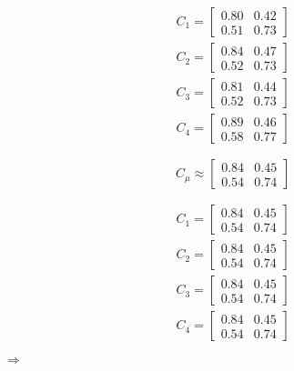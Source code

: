 \documentclass{article}
\begin{document}
\begin{align}
C_1=
\begin{bmatrix}
0.80 & 0.42 \\
0.51 & 0.73
\end{bmatrix}
\\
C_2=
\begin{bmatrix}
0.84 & 0.47 \\
0.52 & 0.73
\end{bmatrix}
\\
C_3=
\begin{bmatrix}
0.81 & 0.44 \\
0.52 & 0.73
\end{bmatrix}
\\
C_4=
\begin{bmatrix}
0.89 & 0.46 \\
0.58 & 0.77
\end{bmatrix}
\end{align}

\[
  C_\mu\approx
  \begin{bmatrix}
  0.84 & 0.45 \\
  0.54 & 0.74
  \end{bmatrix}  
\]

\begin{align}
  C_1=
  \begin{bmatrix}
    0.84 & 0.45 \\
    0.54 & 0.74
  \end{bmatrix}
  \\
  C_2=
  \begin{bmatrix}
    0.84 & 0.45 \\
    0.54 & 0.74
  \end{bmatrix}
  \\
  C_3=
  \begin{bmatrix}
    0.84 & 0.45 \\
    0.54 & 0.74
  \end{bmatrix}
  \\
  C_4=
  \begin{bmatrix}
    0.84 & 0.45 \\
    0.54 & 0.74
  \end{bmatrix}
  \end{align}

  $\Rightarrow$
\end{document}
